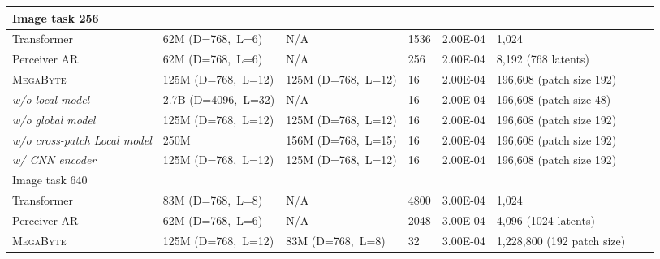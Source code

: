 \documentclass{article}
\newcommand{\fastslow}[0]{\textsc{MegaByte}\xspace}
\newcommand{\megabyte}[0]{\fastslow}
\theoremstyle{plain}
\theoremstyle{definition}
\theoremstyle{remark}
\begin{document}
\begin{table}[h]
\begin{tabular}{llllllll}
\midrule
Image task 256\\
\midrule
Transformer & 62M  (D=768,~L=6) & N/A &  1536  &  2.00E-04 &  1,024  \\
Perceiver AR & 62M (D=768,~L=6)  & N/A &  256 &   2.00E-04 &  8,192 (768 latents)  \\
\megabyte & 125M (D=768,~L=12) & 125M (D=768,~L=12) &  16  &  2.00E-04 &  196,608 (patch size 192)  \\
\hspace{5pt} \textit{w/o local model}  & 2.7B (D=4096,~L=32) & N/A &  16  &  2.00E-04 &  196,608 (patch size 48)  \\
\hspace{5pt} \textit{w/o global model}  &  125M (D=768,~L=12) & 125M (D=768,~L=12)  &  16  &  2.00E-04 &  196,608 (patch size 192)  \\
\hspace{5pt} \textit{w/o cross-patch Local model}  & 250M & 156M (D=768,~L=15) &  16  &  2.00E-04 &  196,608 (patch size 192)  \\
\hspace{5pt} \textit{w/ CNN encoder}  & 125M (D=768,~L=12) & 125M (D=768,~L=12)  &  16  &  2.00E-04 &  196,608 (patch size 192)  \\

\midrule
Image task 640 \\
\midrule
Transformer & 83M (D=768,~L=8)  & N/A & 4800  & 3.00E-04 & 1,024 \\
Perceiver AR  & 62M (D=768,~L=6)  & N/A  & 2048  & 3.00E-04 & 4,096 (1024 latents)  \\
\megabyte & 125M (D=768,~L=12)  & 83M (D=768,~L=8) & 32  & 3.00E-04  & 1,228,800 (192 patch size) \\



\end{tabular}
\end{table}
\end{document}
